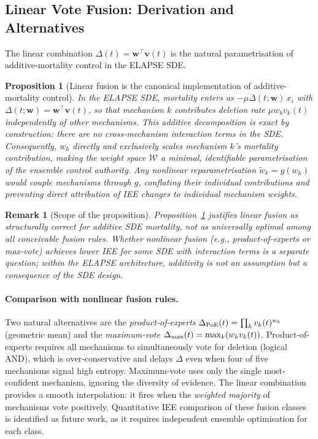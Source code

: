 \documentclass[review,12pt]{elsarticle}
\newcommand{\bfw}{\mathbf{w}}
\newcommand{\bfv}{\mathbf{v}}
\newtheorem{proposition}{Proposition}
\newtheorem{remark}{Remark}
\begin{document}
\subsection{Linear Vote Fusion: Derivation and Alternatives}
\label{sec:fusion_justification}

The linear combination $\Delta(t) = \bfw^\top\bfv(t)$ is the natural
parametrisation of additive-mortality control in the ELAPSE SDE.

\begin{proposition}[Linear fusion is the canonical implementation of additive-mortality control]
\label{prop:fusion}
In the ELAPSE SDE, mortality enters as $-\mu\Delta(t;\bfw)\,x_i$ with
$\Delta(t;\bfw) = \bfw^\top\bfv(t)$, so that mechanism $k$ contributes
deletion rate $\mu w_k v_k(t)$ independently of other mechanisms.
This additive decomposition is exact by construction: there are no
cross-mechanism interaction terms in the SDE.  Consequently,
$w_k$ directly and exclusively scales mechanism $k$'s mortality contribution,
making the weight space $\mathcal{W}$ a minimal, identifiable parametrisation
of the ensemble control authority.  Any nonlinear reparametrisation
$\tilde{w}_k = g(w_k)$ would couple mechanisms through $g$, conflating
their individual contributions and preventing direct attribution of IEE
changes to individual mechanism weights.
\end{proposition}

\begin{remark}[Scope of the proposition]
Proposition~\ref{prop:fusion} justifies linear fusion as \emph{structurally
correct} for additive SDE mortality, not as universally optimal among all
conceivable fusion rules.  Whether nonlinear fusion (e.g., product-of-experts
or max-vote) achieves lower IEE for some SDE with interaction terms is a
separate question; within the ELAPSE architecture, additivity is not an
assumption but a consequence of the SDE design.
\end{remark}

\paragraph{Comparison with nonlinear fusion rules.}
Two natural alternatives are the \emph{product-of-experts}
$\Delta_{\rm PoE}(t) = \prod_k v_k(t)^{w_k}$
(geometric mean) and the \emph{maximum-vote}
$\Delta_{\rm max}(t) = \max_k (w_k v_k(t))$.
Product-of-experts requires all mechanisms to simultaneously vote for deletion
(logical AND), which is over-conservative and delays $\Delta$ even when four
of five mechanisms signal high entropy.  Maximum-vote uses only the single
most-confident mechanism, ignoring the diversity of evidence.  The linear
combination provides a smooth interpolation: it fires when the
\emph{weighted majority} of mechanisms vote positively.
Quantitative IEE comparison of these fusion classes is identified as future work,
as it requires independent ensemble optimisation for each class.
\end{document}
